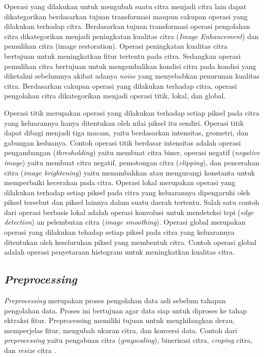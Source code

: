 Operasi yang dilakukan untuk mengubah suatu citra menjadi citra lain dapat dikategorikan berdasarkan tujuan transformasi maupun cakupan operasi yang dilakukan terhadap citra. Berdasarkan tujuan transformasi operasi pengolahan citra dikategorikan menjadi peningkatan kualitas citra (\textit{Image Enhancement}) dan pemulihan citra (image restoration). Operasi peningkatan kualitas citra bertujuan untuk meningkatkan fitur tertentu pada citra. Sedangkan operasi pemulihan citra bertujuan untuk mengembalikan kondisi citra pada kondisi yang diketahui sebelumnya akibat adanya \textit{noise} yang menyebabkan penurunan kualitas citra. Berdasarkan cakupan operasi yang dilakukan terhadap citra, operasi pengolahan citra dikategorikan menjadi operasi titik, lokal, dan global. 

Operasi titik merupakan operasi yang dilakukan terhadap setiap piksel pada citra yang keluarannya hanya ditentukan oleh nilai piksel itu sendiri. Operasi titik dapat dibagi menjadi tiga macam, yaitu berdasarkan intensitas, geometri, dan gabungan keduanya. Contoh operasi titik berdasar intensitas adalah operasi pengambangan (\textit{thresholding}) yaitu membuat citra biner, operasi negatif (\textit{negative image}) yaitu membuat citra negatif, pemotongan citra (\textit{clipping}), dan pencerahan citra (\textit{image brightening}) yaitu menambahkan atau mengurangi konstanta untuk memperbaiki kecerahan pada citra. Operasi lokal merupakan operasi yang dilakukan terhadap setiap piksel pada citra yang keluarannya dipengaruhi oleh piksel tersebut dan piksel lainnya dalam suatu daerah tertentu. Salah satu contoh dari operasi berbasis lokal adalah operasi konvolusi untuk mendeteksi tepi (\textit{edge detection}) an pelembutan citra (\textit{image smoothing}). Operasi global merupakan operasi yang dilakukan tehadap setiap piksel pada citra yang keluarannya ditentukan oleh keseluruhan piksel yang membentuk citra. Contoh operasi global adalah operasi penyetaraan histogram untuk meningkatkan kualitas citra.\\

\subsection{\textit{Preprocessing}}
\textit{Preprocessing} merupakan proses pengolahan data asli sebelum tahapan pengolahan data. Proses ini bertujuan agar data siap untuk diproses ke tahap ektraksi fitur. Preprocessing memiliki tujuan untuk menghilangkan derau, memperjelas fitur, mengubah ukuran citra, dan konversi data. Contoh dari \textit{preprocessing} yaitu pengabuan citra (\textit{grayscaling}), binerisasi citra, \textit{croping} citra, dan \textit{resize} citra \cite{gonzalez}.\\ 


